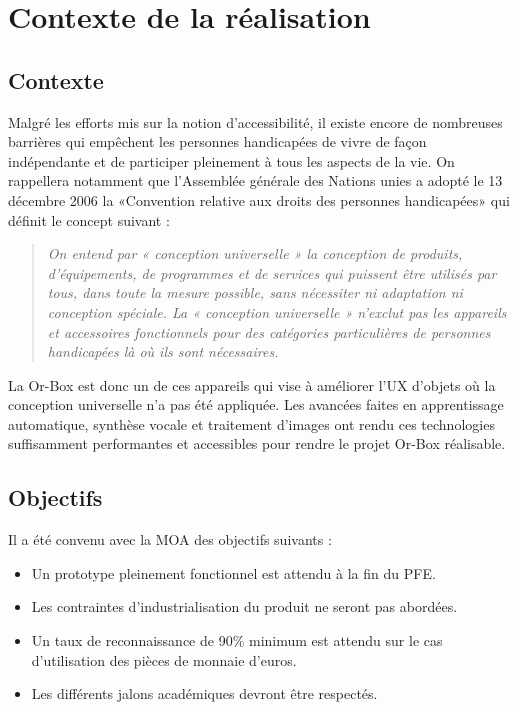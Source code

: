 
\section{Contexte de la réalisation}
 	\subsection{Contexte}
 	\label{sec:contexte}

Malgré les efforts mis sur la notion d'accessibilité, il existe encore de nombreuses barrières qui empêchent les personnes handicapées de vivre de façon indépendante et de participer pleinement à tous les aspects de la vie.
On rappellera notamment que l'Assemblée générale des Nations unies a adopté le 13 décembre 2006 la «Convention relative aux droits des personnes handicapées» qui définit le concept suivant :
\begin{quotation}
	\emph{
	On entend par « conception universelle » la conception de produits, d’équipements, de programmes et de services qui puissent être utilisés par tous, dans toute la mesure possible, sans nécessiter ni adaptation ni conception spéciale.
	La « conception universelle » n’exclut pas les appareils et accessoires fonctionnels pour des catégories particulières de personnes handicapées là où ils sont nécessaires.
	}
\end{quotation}
La Or-Box est donc un de ces appareils qui vise à améliorer l'UX d'objets où la conception universelle n'a pas été appliquée.
Les avancées faites en apprentissage automatique, synthèse vocale et traitement d'images ont rendu ces technologies suffisamment performantes et accessibles pour rendre le projet Or-Box réalisable.
  
  
	\subsection{Objectifs}
\label{sec:objectifs}
		
Il a été convenu avec la MOA des objectifs suivants :
\begin{itemize}
    \item Un prototype pleinement fonctionnel est attendu à la fin du PFE.
    \item Les contraintes d'industrialisation du produit ne seront pas abordées.
    \item Un taux de reconnaissance de 90\% minimum est attendu sur le cas d'utilisation des pièces de monnaie d'euros.
    \item Les différents jalons académiques devront être respectés.
\end{itemize}

